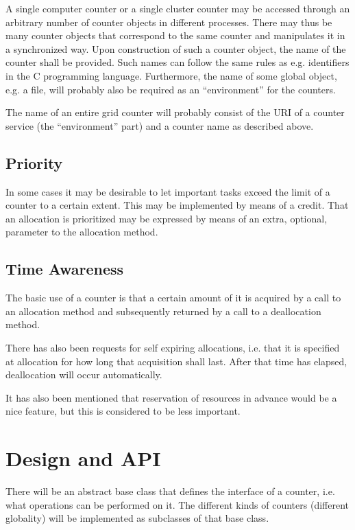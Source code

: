 \documentclass[a4paper,11pt]{article}
\begin{document}
A single computer counter or a single cluster counter may be accessed
through an arbitrary number of counter objects in different processes.
There may thus be many counter objects that correspond to the same
counter and manipulates it in a synchronized way. Upon construction of
such a counter object, the name of the counter shall be provided. Such
names can follow the same rules as e.g. identifiers in the C
programming language. Furthermore, the name of some global object,
e.g. a file, will probably also be required as an ``environment'' for
the counters.

The name of an entire grid counter will probably consist of the URI of
a counter service (the ``environment'' part) and a counter name as
described above.

\subsection{Priority}

In some cases it may be desirable to let important tasks exceed the
limit of a counter to a certain extent. This may be implemented by
means of a credit. That an allocation is prioritized may be expressed
by means of an extra, optional, parameter to the allocation method.

\subsection{Time Awareness}

The basic use of a counter is that a certain amount of it is acquired
by a call to an allocation method and subsequently returned by a call
to a deallocation method.

There has also been requests for self expiring allocations, i.e. that
it is specified at allocation for how long that acquisition shall
last. After that time has elapsed, deallocation will occur
automatically.

It has also been mentioned that reservation of resources in advance
would be a nice feature, but this is considered to be less important.


\section{Design and API}
\label{api}

There will be an abstract base class that defines the interface of a
counter, i.e. what operations can be performed on it. The different
kinds of counters (different globality) will be implemented as
subclasses of that base class.
\end{document}
